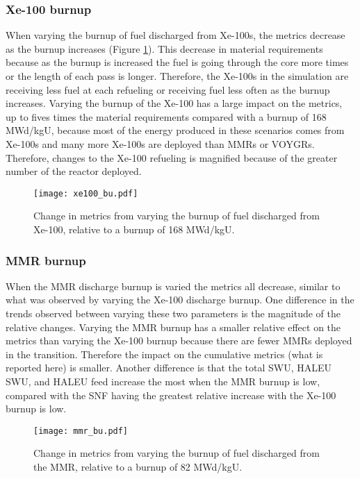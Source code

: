 \subsubsection{Xe-100 burnup}
When varying the burnup of fuel discharged from Xe-100s, the metrics decrease 
as the burnup increases (Figure \ref{fig:xe100_bu_s7}). This decrease in material requirements because as 
the burnup is increased the fuel is going through the core more times or the 
length of each pass is longer. Therefore, the Xe-100s in the simulation are receiving 
less fuel at each refueling or receiving fuel less often as the burnup increases. 
Varying the burnup of the Xe-100 has a large impact on the metrics, up to fives times 
the material requirements compared with a burnup of 168 MWd/kgU, because most of 
the energy produced in these scenarios comes from Xe-100s and many more Xe-100s are 
deployed than \glspl{MMR} or VOYGRs. Therefore, changes to the Xe-100 refueling is 
magnified because of the greater number of the reactor deployed. 

\begin{figure}
    \centering
    \texttt{[image: xe100\_bu.pdf]}
    \caption{Change in metrics from varying the burnup of fuel 
    discharged from Xe-100, relative to a burnup of 168 MWd/kgU.}
    \label{fig:xe100_bu_s7}
\end{figure}

\subsubsection{MMR burnup}
When the \gls{MMR} discharge burnup is varied the metrics all decrease, similar 
to what was observed by varying the Xe-100 discharge burnup. One difference in 
the trends observed between varying these two parameters is the magnitude of 
the relative changes. Varying the \gls{MMR} burnup has a smaller relative effect 
on the metrics than varying the Xe-100 burnup because there are fewer \glspl{MMR} 
deployed in the transition. Therefore the impact on the cumulative metrics 
(what is reported here) is smaller. Another difference is that the total 
\gls{SWU}, \gls{HALEU} \gls{SWU}, and \gls{HALEU} feed increase the most 
when the \gls{MMR} burnup is low, compared with the \gls{SNF} having the 
greatest relative increase with the Xe-100 burnup is low. 

\begin{figure}
    \centering
    \texttt{[image: mmr\_bu.pdf]}
    \caption{Change in metrics from varying the burnup of fuel 
    discharged from the MMR, relative to a burnup of 82 MWd/kgU.}
    \label{fig:mmr_bu_s7}
\end{figure}

